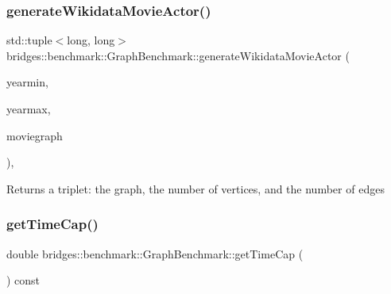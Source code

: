 \mbox{\label{classbridges_1_1benchmark_1_1_graph_benchmark_a561d704a89e9e824cc6b246266cf05d7}} 
\subsubsection{\texorpdfstring{generateWikidataMovieActor()}{generateWikidataMovieActor()}}
{\footnotesize\ttfamily std\+::tuple$<$long, long$>$ bridges\+::benchmark\+::\+Graph\+Benchmark\+::generate\+Wikidata\+Movie\+Actor (\begin{DoxyParamCaption}\item[{int}]{yearmin,  }\item[{int}]{yearmax,  }\item[{\mbox{\hyperlink{classbridges_1_1datastructure_1_1_graph_adj_list}{Graph\+Adj\+List}}$<$ std\+::string $>$ \&}]{moviegraph }\end{DoxyParamCaption})\hspace{0.3cm}{\ttfamily [inline]}, {\ttfamily [protected]}}

\begin{DoxyReturn}{Returns}
a triplet\+: the graph, the number of vertices, and the number of edges 
\end{DoxyReturn}
\mbox{\label{classbridges_1_1benchmark_1_1_graph_benchmark_a2bfaccb0b170b831c1aa9776c0a64d72}} 
\subsubsection{\texorpdfstring{getTimeCap()}{getTimeCap()}}
{\footnotesize\ttfamily double bridges\+::benchmark\+::\+Graph\+Benchmark\+::get\+Time\+Cap (\begin{DoxyParamCaption}{ }\end{DoxyParamCaption}) const\hspace{0.3cm}{\ttfamily [inline]}}



